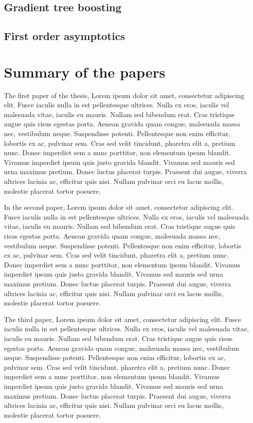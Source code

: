 \section{Gradient tree boosting}

\section{First order asymptotics}



\chapter{Summary of the papers}

The first paper of the thesis, Lorem ipsum dolor sit amet, consectetur adipiscing elit. Fusce iaculis nulla in est pellentesque ultrices. Nulla ex eros, iaculis vel malesuada vitae, iaculis eu mauris. Nullam sed bibendum erat. Cras tristique augue quis risus egestas porta. Aenean gravida quam congue, malesuada massa nec, vestibulum neque. Suspendisse potenti. Pellentesque non enim efficitur, lobortis ex ac, pulvinar sem. Cras sed velit tincidunt, pharetra elit a, pretium nunc. Donec imperdiet sem a nunc porttitor, non elementum ipsum blandit. Vivamus imperdiet ipsum quis justo gravida blandit. Vivamus sed mauris sed urna maximus pretium. Donec luctus placerat turpis. Praesent dui augue, viverra ultrices lacinia ac, efficitur quis nisi. Nullam pulvinar orci eu lacus mollis, molestie placerat tortor posuere.


In the second paper, Lorem ipsum dolor sit amet, consectetur adipiscing elit. Fusce iaculis nulla in est pellentesque ultrices. Nulla ex eros, iaculis vel malesuada vitae, iaculis eu mauris. Nullam sed bibendum erat. Cras tristique augue quis risus egestas porta. Aenean gravida quam congue, malesuada massa nec, vestibulum neque. Suspendisse potenti. Pellentesque non enim efficitur, lobortis ex ac, pulvinar sem. Cras sed velit tincidunt, pharetra elit a, pretium nunc. Donec imperdiet sem a nunc porttitor, non elementum ipsum blandit. Vivamus imperdiet ipsum quis justo gravida blandit. Vivamus sed mauris sed urna maximus pretium. Donec luctus placerat turpis. Praesent dui augue, viverra ultrices lacinia ac, efficitur quis nisi. Nullam pulvinar orci eu lacus mollis, molestie placerat tortor posuere.


The third paper, Lorem ipsum dolor sit amet, consectetur adipiscing elit. Fusce iaculis nulla in est pellentesque ultrices. Nulla ex eros, iaculis vel malesuada vitae, iaculis eu mauris. Nullam sed bibendum erat. Cras tristique augue quis risus egestas porta. Aenean gravida quam congue, malesuada massa nec, vestibulum neque. Suspendisse potenti. Pellentesque non enim efficitur, lobortis ex ac, pulvinar sem. Cras sed velit tincidunt, pharetra elit a, pretium nunc. Donec imperdiet sem a nunc porttitor, non elementum ipsum blandit. Vivamus imperdiet ipsum quis justo gravida blandit. Vivamus sed mauris sed urna maximus pretium. Donec luctus placerat turpis. Praesent dui augue, viverra ultrices lacinia ac, efficitur quis nisi. Nullam pulvinar orci eu lacus mollis, molestie placerat tortor posuere.
